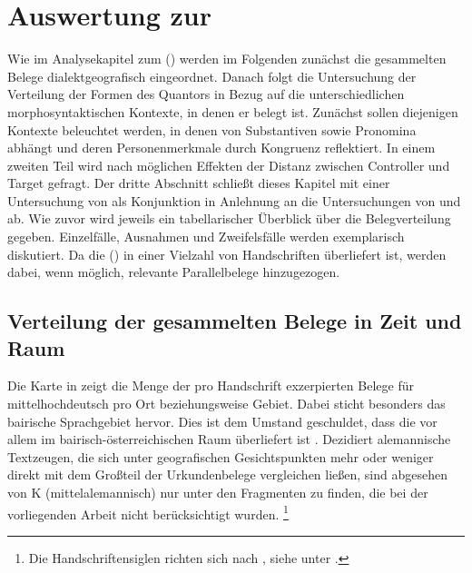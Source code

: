 \chapter{Auswertung zur }
\label{ch:kcanalyse}

Wie im Analysekapitel zum  (\CAO)
werden im Folgenden zunächst die gesammelten Belege dialektgeografisch
eingeordnet. Danach folgt die Untersuchung der Verteilung der Formen des
Quantors  in Bezug auf die unterschiedlichen morphosyntaktischen
Kontexte, in denen er belegt ist. Zunächst sollen diejenigen Kontexte
beleuchtet werden, in denen  von Substantiven sowie Pronomina
abhängt und deren Personenmerkmale durch Kongruenz reflektiert. In einem
zweiten Teil wird nach möglichen Effekten der Distanz zwischen Controller und
Target gefragt. Der dritte Abschnitt schließt dieses Kapitel mit einer
Untersuchung von  als Konjunktion in Anlehnung an die
Untersuchungen von \citet{askedal1974} und \citet{gjelsten1980} ab. Wie zuvor
wird jeweils ein tabellarischer Überblick über die Belegverteilung gegeben.
Einzelfälle, Ausnahmen und Zweifelsfälle werden exemplarisch diskutiert. Da die
 (\KC{}) in einer Vielzahl von Handschriften überliefert
ist, werden dabei, wenn möglich, relevante Parallelbelege hinzugezogen.

\section{Verteilung der gesammelten Belege in Zeit und Raum}
\label{subsec:beiddispmap}


Die Karte in  zeigt die Menge der pro Handschrift
exzerpierten Belege für mittelhochdeutsch  pro Ort beziehungsweise
Gebiet. Dabei sticht besonders das bairische Sprachgebiet hervor.
Dies ist dem Umstand geschuldet, dass die \KC{} vor allem im
bairisch-österreichischen Raum überliefert ist
\autocite{klein1988}. Dezidiert alemannische
Textzeugen, die sich unter geografischen Gesichtspunkten
mehr oder weniger direkt mit dem Großteil der Urkundenbelege vergleichen
ließen, sind abgesehen von K (mittelalemannisch) nur unter den
Fragmenten zu finden, die bei der vorliegenden Arbeit nicht berücksichtigt
wurden.%
%
	\footnote{Die Handschriftensiglen richten sich nach ,
		siehe unter .%
	}

